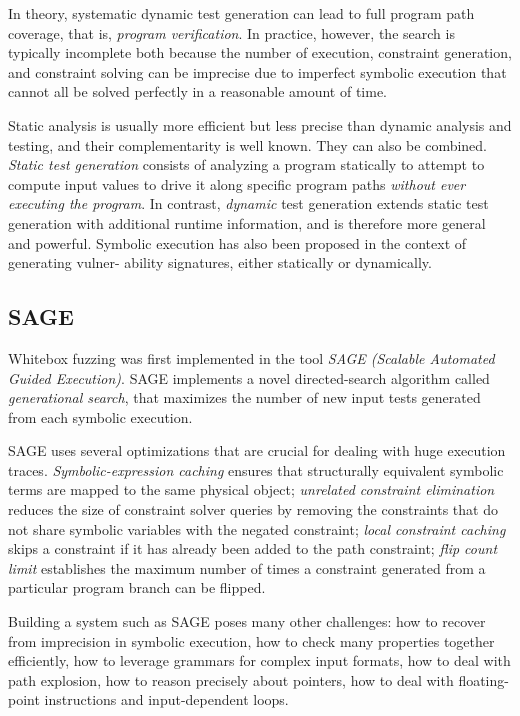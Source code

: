 In theory, systematic dynamic test generation can lead to full program path coverage, that is, \textit{program verification}. In practice, however, the search is typically incomplete both because the number of execution, constraint generation, and constraint solving can be imprecise due to imperfect symbolic execution that cannot all be solved perfectly in a reasonable amount of time.

Static analysis is usually more efficient but less precise than dynamic analysis and testing, and their complementarity is well known.
They can also be combined.
\textit{Static test generation} consists of analyzing a program statically to attempt to compute input values to drive it along specific program paths \textit{without ever executing the program}.
In contrast, \textit{dynamic} test generation extends static test generation with additional runtime information, and is therefore more general and powerful.
Symbolic execution has also been proposed in the context of generating vulner- ability signatures, either statically or dynamically.

\subsection{SAGE}

Whitebox fuzzing was first implemented in the tool \textit{SAGE (Scalable Automated Guided Execution)}. SAGE implements a novel directed-search algorithm called \textit{generational search}, that maximizes the number of new input tests generated from each symbolic execution.

SAGE uses several optimizations that are crucial for dealing with huge execution traces.
\textit{Symbolic-expression caching} ensures that structurally equivalent symbolic terms are mapped to the same physical object; \textit{unrelated constraint elimination} reduces the size of constraint solver queries by removing the constraints that do not share symbolic variables with the negated constraint; \textit{local constraint caching} skips a constraint if it has already been added to the path constraint; \textit{flip count limit} establishes the maximum number of times a constraint generated from a particular program branch can be flipped.

Building a system such as SAGE poses many other challenges: how to recover from imprecision in symbolic execution, how to check many properties together efficiently, how to leverage grammars for complex input formats, how to deal with path explosion, how to reason precisely about pointers, how to deal with floating-point instructions and input-dependent loops.

